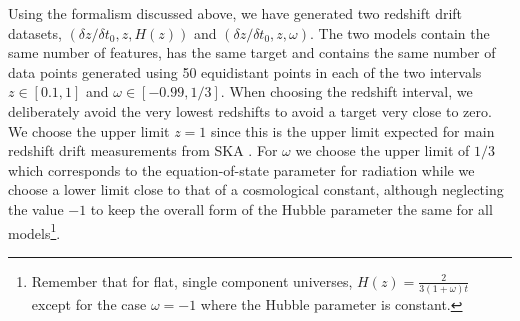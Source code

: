 \documentclass[a4paper,11pt]{article}
\begin{document}
	Using the formalism discussed above, we have generated two redshift drift datasets, $(\delta z/\delta t_0, z, H(z))$ and $(\delta z/\delta t_0, z, \omega)$. The two models contain the same number of features, has the same target and contains the same number of data points generated using 50 equidistant points in each of the two intervals $z\in[0.1,1]$ and $\omega\in[-0.99,1/3]$. When choosing the redshift interval, we deliberately avoid the very lowest redshifts to avoid a target very close to zero. We choose the upper limit $z = 1$ since this is the upper limit expected for main redshift drift measurements from SKA \cite{SKA}. For $\omega$ we choose the upper limit of $1/3$ which corresponds to the equation-of-state parameter for radiation while we choose a lower limit close to that of a cosmological constant, although neglecting the value $-1$ to keep the overall form of the Hubble parameter the same for all models\footnote{Remember that for flat, single component universes, $H(z) = \frac{2}{3(1+\omega)t}$ except for the case $\omega = -1$ where the Hubble parameter is constant.}.
\end{document}
